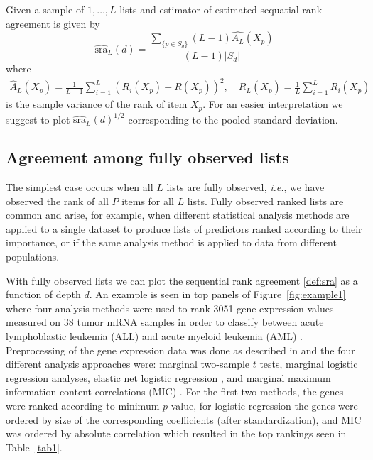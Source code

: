 \documentclass[12pt,a4paper]{article}
\makeatletter
\newcommand{\ie}{\emph{i.e.}\@\xspace}
\theoremstyle{plain}
\makeatother
\begin{document}
Given a sample of $1,\ldots,L$ lists and estimator of estimated sequatial rank agreement is given by
\begin{equation}
\widehat{\textrm{sra}}_L(d)= \frac{\sum_{\{p \in S_d\}}(L-1)\widehat{A_L}(X_p)}{(L-1)|S_d|}\label{def:sra}
\end{equation}
where
\begin{align}
\widehat{A}_L(X_p) = \frac{1}{L-1}\sum_{i=1}^L (R_i(X_p) - \overline{R}(X_p))^2, \quad \overline{R}_L(X_p) = \frac{1}{L}\sum_{i=1}^L R_i(X_p)
\end{align}
is the sample variance of the rank of item $X_p$. For an easier interpretation we suggest to plot $\widehat{\textrm{sra}}_L(d)^{1/2}$ corresponding to the pooled standard deviation.



\subsection{Agreement among fully observed lists}
\label{sec:amfol}

The simplest case occurs when all $L$ lists are fully observed, \ie,
we have observed the rank of all $P$ items for all $L$ lists. Fully
observed ranked lists are common and arise, for example, when
different statistical analysis methods are applied to a single dataset
to produce lists of predictors ranked according to their importance,
or if the same analysis method is applied to data from different
populations.

With fully observed lists we can plot the sequential rank agreement
\eqref{def:sra} as a function of depth $d$. An example is seen in top
panels of Figure~\ref{fig:example1} where four analysis methods were
used to rank 3051 gene expression values measured on 38 tumor mRNA
samples in order to classify between acute lymphoblastic leukemia
(ALL) and acute myeloid leukemia (AML)
\citep{Golub1999}. Preprocessing of the gene expression data was done
as described in \citet{Dudoit2002} and the four different analysis
approaches were: marginal two-sample $t$ tests, marginal logistic
regression analyses, elastic net logistic regression
\citep{friedman2010regularization}, and marginal maximum information
content correlations (MIC) \citep{Reshef2011}. For the first two
methods, the genes were ranked according to minimum $p$ value, for
logistic regression the genes were ordered by size of the
corresponding coefficients (after standardization), and MIC was
ordered by absolute correlation which resulted in the top rankings
seen in Table~\ref{tab1}.
\end{document}

